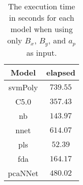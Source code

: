\begin{table}[!ht]
	\centering
	\begin{tabular}{|c|c|}
		\hline
		Model & elapsed \\ \hline
		svmPoly & $739.55$ \\ \hline
		C5.0 & $357.43$ \\ \hline
		nb & $143.97$ \\ \hline
		nnet & $614.07$ \\ \hline
		pls & $52.39$ \\ \hline
		fda & $164.17$ \\ \hline
		pcaNNet & $480.02$ \\ \hline
	\end{tabular}
	\caption{The execution time in seconds for each model when using only $B_{x}$, $B_{y}$, and $a_{p}$ as input.}
	\label{tab:time:xyap:total}
\end{table}
